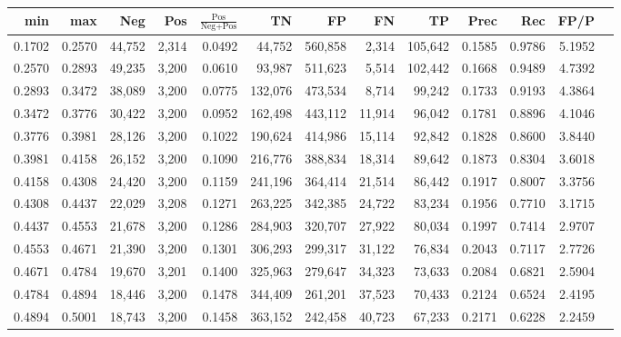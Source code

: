\begin{tabular}{rrrrrrrrrrrrr}
\toprule
   min &    max &    Neg &   Pos & $\frac{\text{Pos}}{\text{Neg}+\text{Pos}}$ &      TN &      FP &      FN &      TP &   Prec &    Rec &   FP/P \\
\midrule
0.1702 & 0.2570 & 44,752 & 2,314 &                                     0.0492 &  44,752 & 560,858 &   2,314 & 105,642 & 0.1585 & 0.9786 & 5.1952 \\
0.2570 & 0.2893 & 49,235 & 3,200 &                                     0.0610 &  93,987 & 511,623 &   5,514 & 102,442 & 0.1668 & 0.9489 & 4.7392 \\
0.2893 & 0.3472 & 38,089 & 3,200 &                                     0.0775 & 132,076 & 473,534 &   8,714 &  99,242 & 0.1733 & 0.9193 & 4.3864 \\
0.3472 & 0.3776 & 30,422 & 3,200 &                                     0.0952 & 162,498 & 443,112 &  11,914 &  96,042 & 0.1781 & 0.8896 & 4.1046 \\
0.3776 & 0.3981 & 28,126 & 3,200 &                                     0.1022 & 190,624 & 414,986 &  15,114 &  92,842 & 0.1828 & 0.8600 & 3.8440 \\
0.3981 & 0.4158 & 26,152 & 3,200 &                                     0.1090 & 216,776 & 388,834 &  18,314 &  89,642 & 0.1873 & 0.8304 & 3.6018 \\
0.4158 & 0.4308 & 24,420 & 3,200 &                                     0.1159 & 241,196 & 364,414 &  21,514 &  86,442 & 0.1917 & 0.8007 & 3.3756 \\
0.4308 & 0.4437 & 22,029 & 3,208 &                                     0.1271 & 263,225 & 342,385 &  24,722 &  83,234 & 0.1956 & 0.7710 & 3.1715 \\
0.4437 & 0.4553 & 21,678 & 3,200 &                                     0.1286 & 284,903 & 320,707 &  27,922 &  80,034 & 0.1997 & 0.7414 & 2.9707 \\
0.4553 & 0.4671 & 21,390 & 3,200 &                                     0.1301 & 306,293 & 299,317 &  31,122 &  76,834 & 0.2043 & 0.7117 & 2.7726 \\
0.4671 & 0.4784 & 19,670 & 3,201 &                                     0.1400 & 325,963 & 279,647 &  34,323 &  73,633 & 0.2084 & 0.6821 & 2.5904 \\
0.4784 & 0.4894 & 18,446 & 3,200 &                                     0.1478 & 344,409 & 261,201 &  37,523 &  70,433 & 0.2124 & 0.6524 & 2.4195 \\
0.4894 & 0.5001 & 18,743 & 3,200 &                                     0.1458 & 363,152 & 242,458 &  40,723 &  67,233 & 0.2171 & 0.6228 & 2.2459 \\

\end{tabular}
